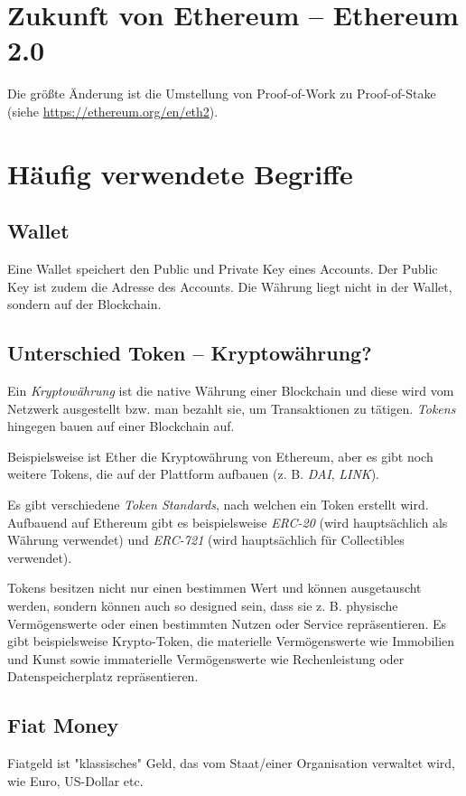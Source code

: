 \section{Zukunft von Ethereum -- Ethereum 2.0}
Die größte Änderung ist die Umstellung von Proof-of-Work zu Proof-of-Stake (siehe \url{https://ethereum.org/en/eth2}).

\section{Häufig verwendete Begriffe}

\subsection{Wallet}
Eine Wallet speichert den Public und Private Key eines Accounts. Der Public Key ist zudem die Adresse des Accounts. Die Währung liegt nicht in der Wallet, sondern auf der Blockchain.

\subsection{Unterschied Token -- Kryptowährung?}\label{l_tokens}
Ein \textit{Kryptowährung} ist die native Währung einer Blockchain und diese wird vom Netzwerk ausgestellt bzw. man bezahlt sie, um Transaktionen zu tätigen. \textit{Tokens} hingegen bauen auf einer Blockchain auf.

Beispielsweise ist Ether die Kryptowährung von Ethereum, aber es gibt noch weitere Tokens, die auf der Plattform aufbauen (z. B. \textit{DAI}, \textit{LINK}).

Es gibt verschiedene \textit{Token Standards}, nach welchen ein Token erstellt wird. Aufbauend auf Ethereum gibt es beispielsweise \textit{ERC-20} (wird hauptsächlich als Währung verwendet) und \textit{ERC-721} (wird hauptsächlich für Collectibles verwendet).

Tokens besitzen nicht nur einen bestimmen Wert und können ausgetauscht werden, sondern können auch so designed sein, dass sie z. B. physische Vermögenswerte oder einen bestimmten Nutzen oder Service repräsentieren. Es gibt beispielsweise Krypto-Token, die materielle Vermögenswerte wie Immobilien und Kunst sowie immaterielle Vermögenswerte wie Rechenleistung oder Datenspeicherplatz repräsentieren.

\cite[vgl. Gemini, Cryptocurrencies vs Tokens]{Cryptocurrencies_vs_Tokens}

\subsection{Fiat Money}
Fiatgeld ist "klassisches" Geld, das vom Staat/einer Organisation verwaltet wird, wie Euro, US-Dollar etc.

